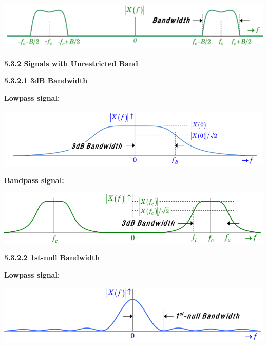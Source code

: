 \documentclass[landscape,a4paper]{extarticle}
\newenvironment{Figure}
  {\noindent\minipage{\linewidth}}
  {\endminipage\par\medskip}
\begin{document}
\begin{multicols*}{5}
    \begin{Figure}
        \centering
        \includegraphics[width=\linewidth]{bandlimitedBandpassSignal.png}
    \end{Figure}
    \textbf{5.3.2 Signals with Unrestricted Band}

    \textbf{5.3.2.1 3dB Bandwidth}

    \textbf{Lowpass signal:}

    \begin{Figure}
        \centering
        \includegraphics[width=\linewidth]{3dB_lowpass.png}
    \end{Figure}

    \textbf{Bandpass signal:}

    \begin{Figure}
        \centering
        \includegraphics[width=\linewidth]{3dB_bandpass.png}
    \end{Figure}
    
    \textbf{5.3.2.2 1st-null Bandwidth}

    \textbf{Lowpass signal: } 

    \begin{Figure}
        \centering
        \includegraphics[width=\linewidth]{1stNull_lowpass.png}
    \end{Figure}


\end{multicols*}
\end{document}
